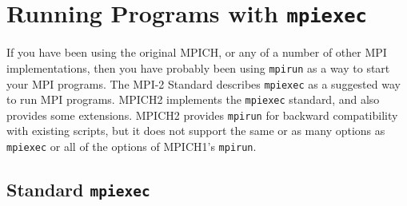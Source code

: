 \documentclass[dvipdfm,11pt]{article}
\begin{document}



\section{Running Programs with \texttt{mpiexec}}
\label{sec:mpiexec}

If you have been using the original MPICH, or any of a number of other MPI
implementations, then you have probably been using \texttt{mpirun} as a
way to start your MPI programs.
The MPI-2 Standard describes \texttt{mpiexec} as a suggested way to run
MPI programs.  MPICH2 implements the \texttt{mpiexec} standard, and also
provides some extensions.  MPICH2 provides \texttt{mpirun} for backward
compatibility with existing scripts, but it does not support the same or
as many options as \texttt{mpiexec} or all of the options of MPICH1's
\texttt{mpirun}.   

\subsection{Standard \texttt{mpiexec}}
\label{sec:mpiexec-standard}
\end{document}
